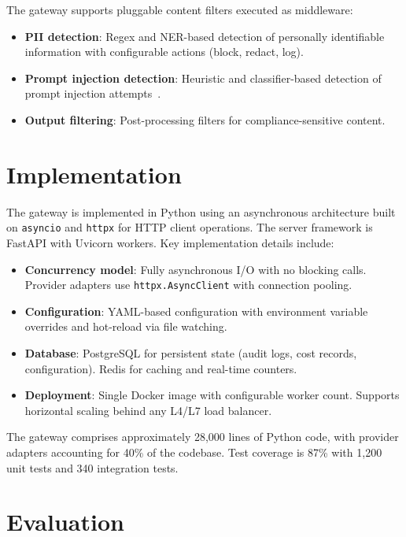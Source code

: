 \documentclass[11pt,twocolumn]{article}
\begin{document}
The gateway supports pluggable content filters executed as middleware:

\begin{itemize}[leftmargin=*]
    \item \textbf{PII detection}: Regex and NER-based detection of personally identifiable information with configurable actions (block, redact, log).
    \item \textbf{Prompt injection detection}: Heuristic and classifier-based detection of prompt injection attempts~\cite{perez2022ignore}.
    \item \textbf{Output filtering}: Post-processing filters for compliance-sensitive content.
\end{itemize}

\section{Implementation}
\label{sec:implementation}

The gateway is implemented in Python using an asynchronous architecture built on \texttt{asyncio} and \texttt{httpx} for HTTP client operations. The server framework is FastAPI with Uvicorn workers. Key implementation details include:

\begin{itemize}[leftmargin=*]
    \item \textbf{Concurrency model}: Fully asynchronous I/O with no blocking calls. Provider adapters use \texttt{httpx.AsyncClient} with connection pooling.
    \item \textbf{Configuration}: YAML-based configuration with environment variable overrides and hot-reload via file watching.
    \item \textbf{Database}: PostgreSQL for persistent state (audit logs, cost records, configuration). Redis for caching and real-time counters.
    \item \textbf{Deployment}: Single Docker image with configurable worker count. Supports horizontal scaling behind any L4/L7 load balancer.
\end{itemize}

The gateway comprises approximately 28,000 lines of Python code, with provider adapters accounting for 40\% of the codebase. Test coverage is 87\% with 1,200 unit tests and 340 integration tests.

\section{Evaluation}
\label{sec:evaluation}
\end{document}
